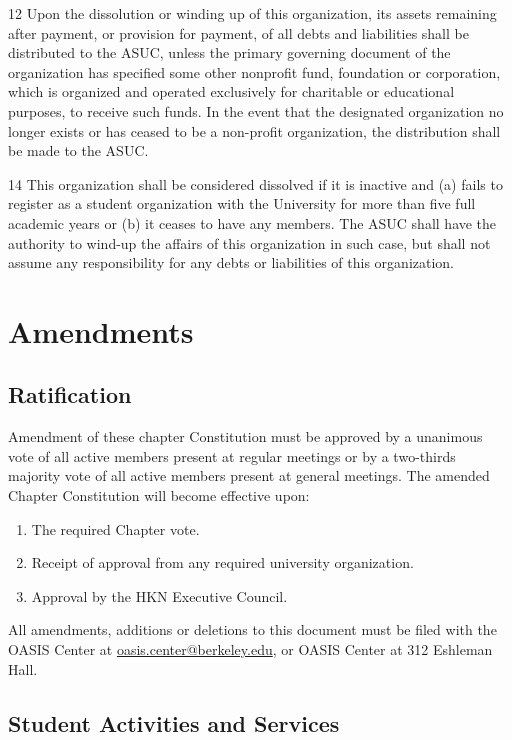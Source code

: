 \documentclass[11pt]{article}
\begin{document}
12 Upon the dissolution or winding up of this organization, its assets remaining after payment, or provision for payment, of all debts and liabilities shall be distributed to the ASUC, unless the primary governing document of the organization has specified some other nonprofit fund, foundation or corporation, which is organized and operated exclusively for charitable or educational purposes, to receive such funds.
In the event that the designated organization no longer exists or has ceased to be a non-profit organization, the distribution shall be made to the ASUC.

14 This organization shall be considered dissolved if it is inactive and (a) fails to register as a student organization with the University for more than five full academic years or (b) it ceases to have any members.
The ASUC shall have the authority to wind-up the affairs of this organization in such case, but shall not assume any responsibility for any debts or liabilities of this organization.
\section{Amendments}
\label{sec:orgbaa9255}

\subsection{Ratification}
\label{sec:org1269e27}

Amendment of these chapter Constitution must be approved by a unanimous vote of all active members present at regular meetings or by a two-thirds majority vote of all active members present at general meetings.
The amended Chapter Constitution will become effective upon:

\begin{enumerate}
\item The required Chapter vote.
\item Receipt of approval from any required university organization.
\item Approval by the HKN Executive Council.
\end{enumerate}

All amendments, additions or deletions to this document must be filed with the OASIS Center at \href{mailto:oasis.center@berkeley.edu}{oasis.center@berkeley.edu}, or OASIS Center at 312 Eshleman Hall.

\subsection{Student Activities and Services}
\label{sec:org276a1b9}
\end{document}
